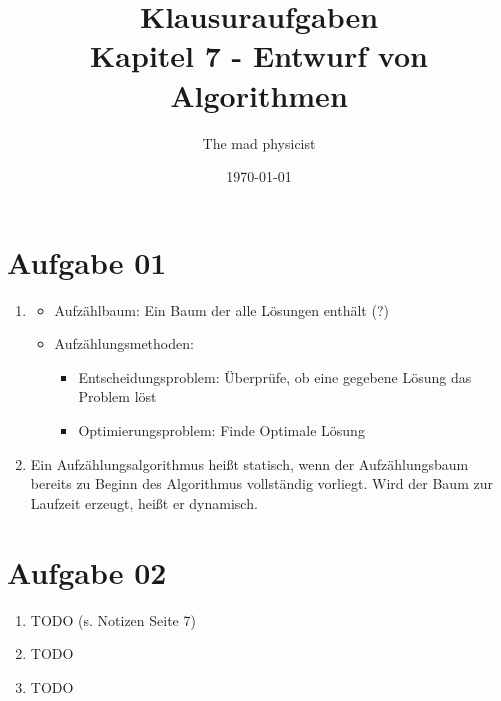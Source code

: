 \documentclass[10pt,a4paper]{article}
\begin{document}
\title{Klausuraufgaben \\
\small{Kapitel 7 - Entwurf von Algorithmen}}
\author{The mad physicist}
\date{\today}
\maketitle

\section*{Aufgabe 01}
    \begin{enumerate}[label={\alph*)}]
        \item
            \begin{itemize}
                \item Aufz\"ahlbaum: Ein Baum der alle L\"osungen
                    enth\"alt (?)
                \item Aufz\"ahlungsmethoden: \\
                    \begin{itemize}
                        \item Entscheidungsproblem: 
                            \"Uberpr\"ufe, ob eine 
                            gegebene L\"osung das
                            Problem l\"ost
                        \item Optimierungsproblem:
                            Finde Optimale L\"osung
                    \end{itemize}

            \end{itemize}

        \item Ein Aufz\"ahlungsalgorithmus hei\ss t statisch, wenn der
            Aufz\"ahlungsbaum bereits zu Beginn des Algorithmus vollst\"andig 
            vorliegt. Wird der Baum zur Laufzeit erzeugt, hei\ss t er dynamisch.
    \end{enumerate}
    
\section*{Aufgabe 02}
    \begin{enumerate}[label={\alph*)}]
        
        \item TODO (s. Notizen Seite 7)
        
        \item TODO
        
        \item TODO
        
    \end{enumerate}
\end{document}
